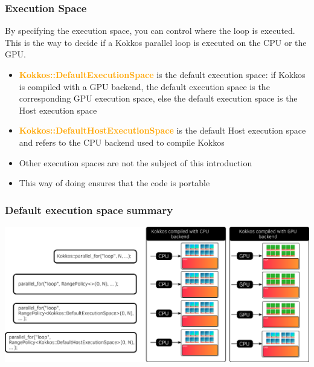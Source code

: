 \documentclass[aspectratio=169]{beamer}
\newcommand{\highlight}[1]{\textcolor{orange}{\textbf{#1}}}
\begin{document}

\begin{frame}[fragile]
    \frametitle{Execution Space}

By specifying the execution space, you can control where the loop is executed.
This is the way to decide if a Kokkos parallel loop is executed on the CPU or the GPU.

\begin{itemize}
    \item \highlight{Kokkos::DefaultExecutionSpace} is the default execution space: if Kokkos is compiled with a GPU backend, the default execution space is the corresponding GPU execution space, else the default execution space is the Host execution space
    \item \highlight{Kokkos::DefaultHostExecutionSpace} is the default Host execution space and refers to the CPU backend used to compile Kokkos
    \item Other execution spaces are not the subject of this introduction
    \item This way of doing ensures that the code is portable
\end{itemize}

\end{frame}


\begin{frame}[fragile]
    \frametitle{Default execution space summary}

\begin{center}
    \includegraphics[width=\textwidth]{../../images/default_execution_space.png}
\end{center}

\end{frame}

\end{document}
